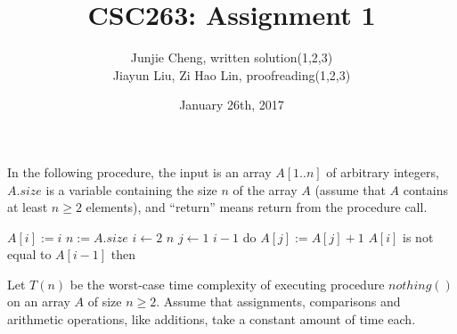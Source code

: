 \documentclass[11pt, answers]{exam}
\theoremstyle{plain}
\theoremstyle{definition}
\begin{document}
 


\title{CSC263: Assignment 1}
\date{January 26th, 2017}
\author{Junjie Cheng, written solution(1,2,3)\\ Jiayun Liu, Zi Hao Lin, proofreading(1,2,3)}
\maketitle

\unframedsolutions

\begin{questions}

\question

In the following procedure, the input is an array $A[1..n]$ of arbitrary integers, $A.size$ is a variable containing the size $n$ of the array $A$ (assume that $A$ contains at least $n \ge 2$ elements), and “return” means return from the procedure call.

\begin{codebox}
\li $A[i] := i$
\li $n := A.size$
\li \For $i \gets 2$ \To $n$ \Do
\li 	\For $j \gets 1$ \To $i-1$ do $A[j] := A[j]+1$
\li		\If $A[i]$ is not equal to $A[i-1]$ then \Return \End 
		\End 
	\End
\li \Return
\end{codebox}

Let $T(n)$ be the worst-case time complexity of executing procedure $nothing()$ on an array $A$ of size $n \ge 2$. Assume that assignments, comparisons and arithmetic operations, like additions, take a constant amount of time each.




\end{questions}
\end{document}
